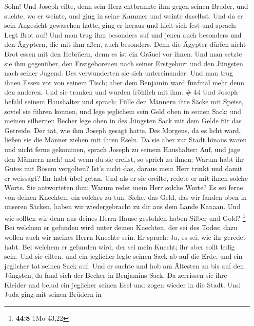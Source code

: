 Sohn!  Und Joseph eilte, denn sein Herz entbrannte ihm
gegen seinen Bruder, und suchte, wo er weinte, und ging in seine Kammer
und weinte daselbst.  Und da er sein Angesicht gewaschen
hatte, ging er heraus und hielt sich fest und sprach: Legt Brot auf!
 Und man trug ihm besonders auf und jenen auch besonders
und den Ägyptern, die mit ihm aßen, auch besonders. Denn die Ägypter
dürfen nicht Brot essen mit den Hebräern, denn es ist ein Gräuel vor
ihnen.  Und man setzte sie ihm gegenüber, den Erstgeborenen
nach seiner Erstgeburt und den Jüngsten nach seiner Jugend. Des
verwunderten sie sich untereinander.  Und man trug ihnen
Essen vor von seinem Tisch; aber dem Benjamin ward fünfmal mehr denn den
anderen. Und sie tranken und wurden fröhlich mit ihm. \# 44 
Und Joseph befahl seinem Haushalter und sprach: Fülle den Männern ihre
Säcke mit Speise, soviel sie führen können, und lege jeglichem sein Geld
oben in seinen Sack;  und meinen silbernen Becher lege oben
in des Jüngsten Sack mit dem Gelde für das Getreide. Der tat, wie ihm
Joseph gesagt hatte.  Des Morgens, da es licht ward, ließen
sie die Männer ziehen mit ihren Eseln.  Da sie aber zur
Stadt hinaus waren und nicht ferne gekommen, sprach Joseph zu seinem
Haushalter: Auf, und jage den Männern nach! und wenn du sie ereilst, so
sprich zu ihnen: Warum habt ihr Gutes mit Bösem vergolten? 
Ist's nicht das, daraus mein Herr trinkt und damit er weissagt? Ihr habt
übel getan.  Und als er sie ereilte, redete er mit ihnen
solche Worte.  Sie antworteten ihm: Warum redet mein Herr
solche Worte? Es sei ferne von deinen Knechten, ein solches zu tun.
 Siehe, das Geld, das wir fanden oben in unseren Säcken,
haben wir wiedergebracht zu dir aus dem Lande Kanaan. Und wie sollten
wir denn aus deines Herrn Hause gestohlen haben Silber und Gold?
\footnote{\textbf{44:8} 1Mo 43,22}  Bei welchem er gefunden
wird unter deinen Knechten, der sei des Todes; dazu wollen auch wir
meines Herrn Knechte sein.  Er sprach: Ja, es sei, wie ihr
geredet habt. Bei welchem er gefunden wird, der sei mein Knecht; ihr
aber sollt ledig sein.  Und sie eilten, und ein jeglicher
legte seinen Sack ab auf die Erde, und ein jeglicher tat seinen Sack
auf.  Und er suchte und hob am Ältesten an bis auf den
Jüngsten; da fand sich der Becher in Benjamins Sack.  Da
zerrissen sie ihre Kleider und belud ein jeglicher seinen Esel und zogen
wieder in die Stadt.  Und Juda ging mit seinen Brüdern in
